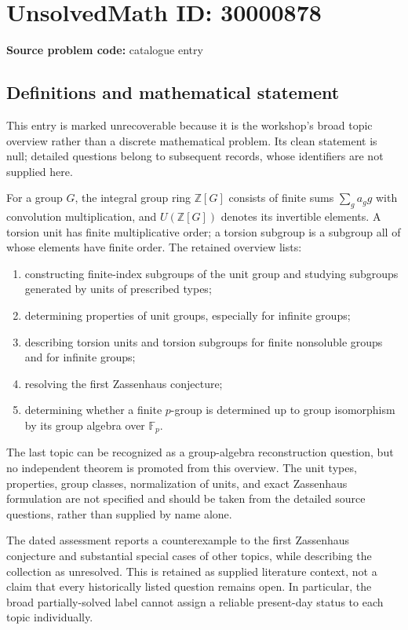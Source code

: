 \documentclass[11pt]{article}
\newcommand{\Z}{\mathbb{Z}}
\newcommand{\F}{\mathbb{F}}
\begin{document}
\section*{UnsolvedMath ID: 30000878}
\textbf{Source problem code:} catalogue entry
\subsection{Definitions and mathematical statement}
This entry is marked unrecoverable because it is the workshop's broad topic overview rather than a discrete mathematical problem. Its clean statement is null; detailed questions belong to subsequent records, whose identifiers are not supplied here.

For a group $G$, the integral group ring $\Z[G]$ consists of finite sums $\sum_g a_gg$ with convolution multiplication, and $U(\Z[G])$ denotes its invertible elements. A torsion unit has finite multiplicative order; a torsion subgroup is a subgroup all of whose elements have finite order. The retained overview lists:
\begin{enumerate}
\item constructing finite-index subgroups of the unit group and studying subgroups generated by units of prescribed types;
\item determining properties of unit groups, especially for infinite groups;
\item describing torsion units and torsion subgroups for finite nonsoluble groups and for infinite groups;
\item resolving the first Zassenhaus conjecture;
\item determining whether a finite $p$-group is determined up to group isomorphism by its group algebra over $\F_p$.
\end{enumerate}
The last topic can be recognized as a group-algebra reconstruction question, but no independent theorem is promoted from this overview. The unit types, properties, group classes, normalization of units, and exact Zassenhaus formulation are not specified and should be taken from the detailed source questions, rather than supplied by name alone.

The dated assessment reports a counterexample to the first Zassenhaus conjecture and substantial special cases of other topics, while describing the collection as unresolved. This is retained as supplied literature context, not a claim that every historically listed question remains open. In particular, the broad partially-solved label cannot assign a reliable present-day status to each topic individually.
\end{document}

